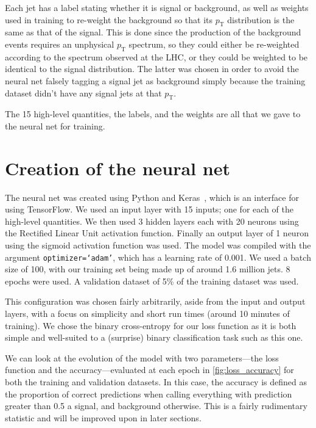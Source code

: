 \documentclass[11pt]{article}
\numberwithin{equation}{section}
\numberwithin{figure}{section}
\numberwithin{table}{section}
\begin{document}
Each jet has a label stating whether it is signal or background, as well as weights used in training to re-weight the background so that its $p_\mathrm{T}$ distribution is the same as that of the signal. This is done since the production of the background events requires an unphysical $p_\mathrm{T}$ spectrum, so they could either be re-weighted according to the spectrum observed at the LHC, or they could be weighted to be identical to the signal distribution. The latter was chosen in order to avoid the neural net falsely tagging a signal jet as background simply because the training dataset didn't have any signal jets at that $p_\mathrm{T}$. 

The 15 high-level quantities, the labels, and the weights are all that we gave to the neural net for training.

\section{Creation of the neural net}\label{sec:CreatingNeuralNet}
The neural net was created using Python and Keras~\cite{keras}, which is an interface for using TensorFlow. We used an input layer with 15 inputs; one for each of the high-level quantities. We then used 3 hidden layers each with 20 neurons using the Rectified Linear Unit activation function. Finally an output layer of 1 neuron using the sigmoid activation function was used. The model was compiled with the argument \texttt{optimizer=`adam'}, which has a learning rate of 0.001. We used a batch size of 100, with our training set being made up of around 1.6 million jets. 8 epochs were used. A validation dataset of 5\% of the training dataset was used.

This configuration was chosen fairly arbitrarily, aside from the input and output layers, with a focus on simplicity and short run times (around 10 minutes of training). We chose the binary cross-entropy for our loss function as it is both simple and well-suited to a (surprise) binary classification task such as this one.

We can look at the evolution of the model with two parameters---the loss function and the accuracy---evaluated at each epoch in \cref{fig:loss_accuracy} for both the training and validation datasets. In this case, the accuracy is defined as the proportion of correct predictions when calling everything with prediction greater than 0.5 a signal, and background otherwise. This is a fairly rudimentary statistic and will be improved upon in later sections.
\end{document}

